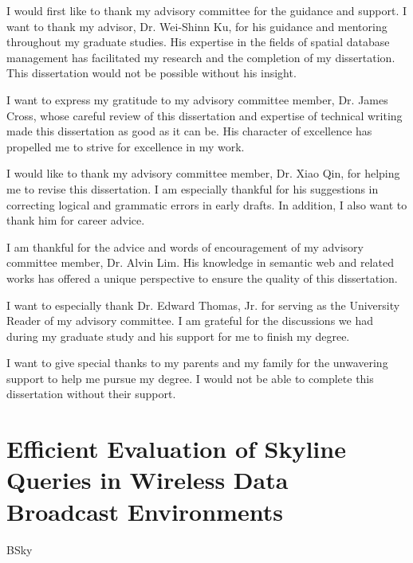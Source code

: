 \documentclass[12pt]{report}
\begin{document}
\begin{romanpages}
\begin{acknowledgments}

I would first like to thank my advisory committee for the guidance and support.
I want to thank my advisor, Dr. Wei-Shinn Ku, for his guidance and mentoring throughout my graduate studies. His expertise in the fields of spatial database management has facilitated my research and the completion of my dissertation. This dissertation would not be possible without his insight.

I want to express my gratitude to my advisory committee member, Dr. James Cross, whose careful review of this dissertation and expertise of technical writing made this dissertation as good as it can be. His character of excellence has propelled me to strive for excellence in my work.

I would like to thank my advisory committee member, Dr. Xiao Qin, for helping me to revise this dissertation. I am especially thankful for his suggestions in correcting logical and grammatic errors in early drafts. In addition, I also want to thank him for career advice.

I am thankful for the advice and words of encouragement of my advisory committee member, Dr. Alvin Lim. His knowledge in semantic web and related works has offered a unique perspective to ensure the quality of this dissertation.

I want to especially thank Dr. Edward Thomas, Jr. for serving as the University Reader of my advisory committee. I am grateful for the discussions we had during my graduate study and his support for me to finish my degree.

I want to give special thanks to my parents and my family for the unwavering support to help me pursue my degree. I would not be able to complete this dissertation without their support.
\end{acknowledgments}

\tableofcontents
\listoffigures
\listoftables
\end{romanpages}        %



\chapter{Efficient Evaluation of Skyline Queries in Wireless Data Broadcast Environments}
{BSky}
\end{document}
